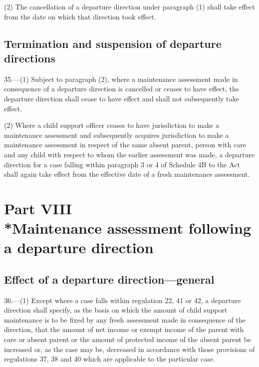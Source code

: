 \documentclass[a4paper]{article}
\newcommand{\parthead}{}
\begin{document}
(2) The cancellation of a departure direction under paragraph (1) shall take effect from the date on which that direction took effect.

\subsection[35. Termination and suspension of departure directions]{Termination and suspension of departure directions}

35.—(1) Subject to paragraph (2), where a maintenance assessment made in consequence of a departure direction is cancelled or ceases to have effect, the departure direction shall cease to have effect and shall not subsequently take effect.

(2) Where a child support officer ceases to have jurisdiction to make a maintenance assessment and subsequently acquires jurisdiction to make a maintenance assessment in respect of the same absent parent, person with care and any child with respect to whom the earlier assessment was made, a departure direction for a case falling within paragraph 3 or 4 of Schedule 4B to the Act shall again take effect from the effective date of a fresh maintenance assessment.

\section[Part VIII --- Maintenance assessment following a departure direction]{Part VIII\\*Maintenance assessment following a departure direction}

\renewcommand\parthead{--- Part VIII}

\subsection[36. Effect of a departure direction—general]{Effect of a departure direction—general}

36.—(1) Except where a case falls within regulation 22, 41 or 42, a departure direction shall specify, as the basis on which the amount of child support maintenance is to be fixed by any fresh assessment made in consequence of the direction, that the amount of net income or exempt income of the parent with care or absent parent or the amount of protected income of the absent parent be increased or, as the case may be, decreased in accordance with those provisions of regulations 37, 38 and 40 which are applicable to the particular case.
\end{document}
